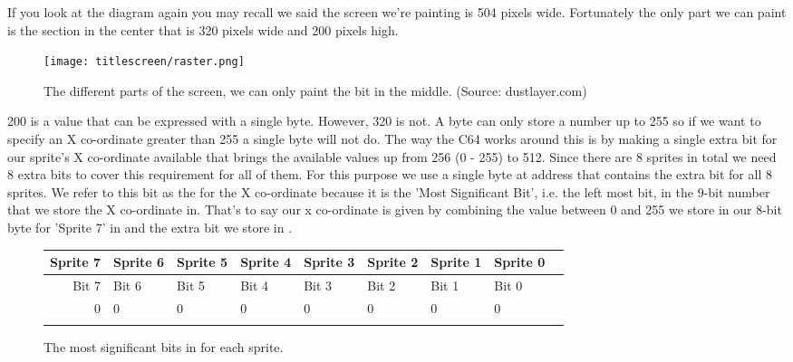 If you look at the diagram again you may recall we said the screen we're painting is 504 pixels wide. Fortunately the only 
part we can paint is the section in the center that is 320 pixels wide and 200 pixels high. 

\begin{figure}[H]
    \centering
      \texttt{[image: titlescreen/raster.png]}%
  \caption{The different parts of the screen, we can only paint the bit in the middle. (Source: dustlayer.com)}
\end{figure}

200 is a value that can be expressed with a single byte. However, 320 is not. A byte can only store a number up to 255
so if we want to specify an X co-ordinate greater than 255 a single byte will not do. The way the C64 works around this
is by making a single extra bit for our sprite's X co-ordinate available that brings the available values up from 256
(0 - 255) to 512. Since there are 8 sprites in total we need 8 extra bits to cover this requirement for all of them.
For this purpose we use a single byte at address  that contains the extra bit for all 8 sprites. We refer
to this bit as the  for the X co-ordinate because it is the 'Most Significant Bit', i.e. the left most bit,
in the 9-bit number that we store the X co-ordinate in. That's to say our x co-ordinate is given by combining the value
between 0 and 255 we store in our 8-bit byte for 'Sprite 7' in  and the extra bit we store in .

\begin{figure}[H]
  {
    \setlength{\tabcolsep}{3.0pt}
    \setlength\cmidrulewidth{\heavyrulewidth} %
    \begin{adjustbox}{width=10cm,center}

      \begin{tabular}{rllllllll}
        \toprule
        Sprite 7 & Sprite 6 & Sprite 5 & Sprite 4 & Sprite 3 & Sprite 2 & Sprite 1 & Sprite 0        \\
        \midrule
        Bit 7 & Bit 6 & Bit 5 & Bit 4 & Bit 3 & Bit 2 & Bit 1 & Bit 0        \\
        \midrule
        0 & 0 & 0 & 0 & 0 & 0 & 0 & 0 \\
        \addlinespace
        \bottomrule
      \end{tabular}

    \end{adjustbox}

  }\caption*{The most significant bits in  for each sprite.}
\end{figure}

